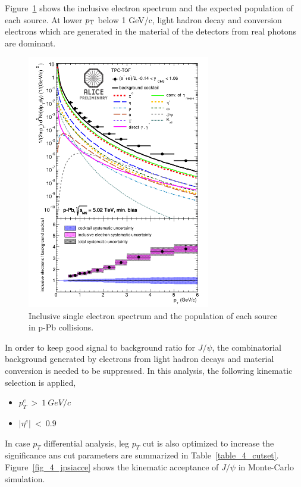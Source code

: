 Figure~\ref{fig_4_single} shows the inclusive electron spectrum and the expected population of each source. 
At lower $p_{\rm{T}}$ below 1 GeV/c, light hadron decay and conversion electrons which are generated in the material of the detectors from real photons are dominant. 
\begin{figure}[!h]
  \centering
  \includegraphics[width=8cm]{chap4/figure/Kinematics/single.png}
  \caption{Inclusive single electron spectrum and the population of each source in p-Pb collisions. }
  \label{fig_4_single}
\end{figure}
In order to keep good signal to background ratio for $J/\psi$, the combinatorial background generated by electrons from light hadron decays and material conversion is needed to be suppressed. 
In this analysis, the following kinematic selection is applied, 
\begin{itemize}
  \item $p^{e}_{T}~>~1~GeV/c$ 
  \item $|\eta^{e}|~<~0.9$
\end{itemize}
In case $p_{T}$ differential analysis, leg $p_{T}$ cut is also optimized to increase the significance ans cut parameters are summarized in Table~\ref{table_4_cutset}. 
Figure~\ref{fig_4_jpsiacce} shows the kinematic acceptance of $J/\psi$ in Monte-Carlo simulation. 

